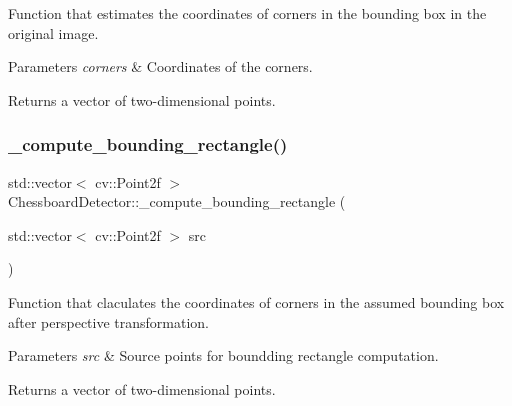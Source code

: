 Function that estimates the coordinates of corners in the bounding box in the original image. 


\begin{DoxyParams}{Parameters}
{\em corners} & Coordinates of the corners. \\
\hline
\end{DoxyParams}
\begin{DoxyReturn}{Returns}
a vector of two-\/dimensional points. 
\end{DoxyReturn}
\mbox{\label{class_chessboard_detector_a8de461985954069f87c868a930f81f2d}} 
\subsubsection{\texorpdfstring{\+\_\+compute\+\_\+bounding\+\_\+rectangle()}{\_compute\_bounding\_rectangle()}}
{\footnotesize\ttfamily std\+::vector$<$ cv\+::\+Point2f $>$ Chessboard\+Detector\+::\+\_\+compute\+\_\+bounding\+\_\+rectangle (\begin{DoxyParamCaption}\item[{std\+::vector$<$ cv\+::\+Point2f $>$}]{src }\end{DoxyParamCaption})\hspace{0.3cm}{\ttfamily [private]}}



Function that claculates the coordinates of corners in the assumed bounding box after perspective transformation. 


\begin{DoxyParams}{Parameters}
{\em src} & Source points for boundding rectangle computation. \\
\hline
\end{DoxyParams}
\begin{DoxyReturn}{Returns}
a vector of two-\/dimensional points. 
\end{DoxyReturn}
\mbox{\label{class_chessboard_detector_aab8f57b255da1d014e58d5e7aa984a3e}} 
